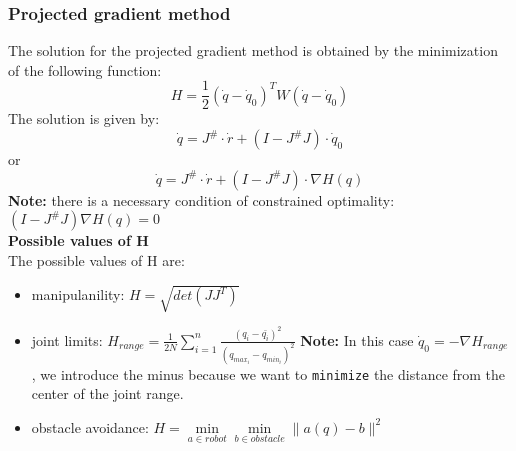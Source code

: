 \documentclass[a4paper,12pt]{article}
\begin{document}
    \subsubsection{Projected gradient method}\label{sec:Projected gradient method}
    The solution for the projected gradient method is obtained by the minimization 
    of the following function:
    \begin{equation}
        H = \frac{1}{2} (\dot{q}-\dot{q}_0)^T W (\dot{q}-\dot{q}_0)
    \end{equation}
    The solution is
     given by:\begin{equation}
        \dot{q} = J^\# \cdot \dot{r} + (I - J^\# J) \cdot \dot{q}_0
    \end{equation} or \begin{equation}
        \dot{q} = J^\# \cdot \dot{r} + (I - J^\# J) \cdot \nabla H(q)
    \end{equation}
    \textbf{Note:} there is a necessary condition of constrained 
    optimality: $(I - J^\# J) \nabla H(q) = 0$\\
    \textbf{Possible values of H} \\
    The possible values of H are:
    \begin{itemize}
        \item manipulanility: $H = \sqrt{det(J J^T)}$
        \item joint limits: $H_{range} = \frac{1}{2N}\sum_{i=1}^{n} \frac{(q_i - \bar{q_i})^2}{(q_{max_i} - q_{min_i})^2}$
        \textbf{Note:} In this case $\dot{q}_0 = - \nabla H_{range}$, we introduce the minus because
        we want to \texttt{minimize} the distance from the center of the joint range.
        \item obstacle avoidance: $H = \min\limits_{a \in robot} \min\limits_{b \in obstacle} \|a(q) - b\|^2$
    \end{itemize}
\end{document}

